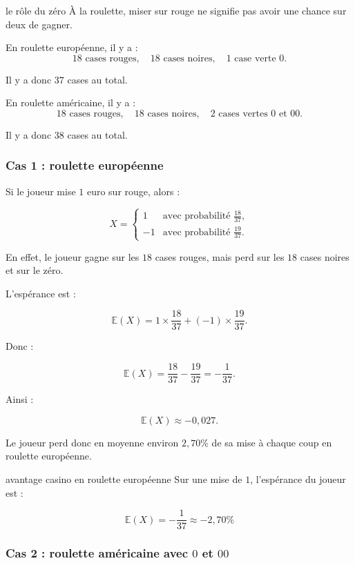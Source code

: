 \documentclass[11pt,a4paper]{article}
\begin{document}
\begin{contexte}{le rôle du zéro}
À la roulette, miser sur rouge ne signifie pas avoir une chance sur deux de gagner.

En roulette européenne, il y a :
\[
18 \text{ cases rouges},\quad 18 \text{ cases noires},\quad 1 \text{ case verte }0.
\]

Il y a donc \(37\) cases au total.

En roulette américaine, il y a :
\[
18 \text{ cases rouges},\quad 18 \text{ cases noires},\quad 2 \text{ cases vertes }0\text{ et }00.
\]

Il y a donc \(38\) cases au total.
\end{contexte}

\subsubsection*{Cas 1 : roulette européenne}

Si le joueur mise \(1\) euro sur rouge, alors :

\[
X=
\begin{cases}
1 & \text{avec probabilité } \frac{18}{37},\\
-1 & \text{avec probabilité } \frac{19}{37}.
\end{cases}
\]

En effet, le joueur gagne sur les \(18\) cases rouges, mais perd sur les \(18\) cases noires et sur le zéro.

L'espérance est :

\[
\mathbb{E}(X)
=
1\times \frac{18}{37}
+
(-1)\times \frac{19}{37}.
\]

Donc :

\[
\mathbb{E}(X)
=
\frac{18}{37}-\frac{19}{37}
=
-\frac{1}{37}.
\]

Ainsi :

\[
\mathbb{E}(X)\approx -0{,}027.
\]

Le joueur perd donc en moyenne environ \(2{,}70\%\) de sa mise à chaque coup en roulette européenne.

\begin{equationbox}{avantage casino en roulette européenne}
Sur une mise de \(1\), l'espérance du joueur est :

\[
\boxed{\mathbb{E}(X)=-\frac{1}{37}\approx -2{,}70\%}
\]
\end{equationbox}

\subsubsection*{Cas 2 : roulette américaine avec \(0\) et \(00\)}
\end{document}
